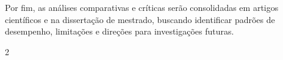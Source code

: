 \documentclass[11pt]{article}
\begin{document}
Por fim, as análises comparativas e críticas serão consolidadas em artigos científicos e na dissertação de mestrado, buscando identificar padrões de desempenho, limitações e direções para investigações futuras. 


\newpage

\begingroup
\footnotesize
\setlength{\columnsep}{1em}
\begin{multicols}{2}
\printbibliography
\end{multicols}
\endgroup
\end{document}
